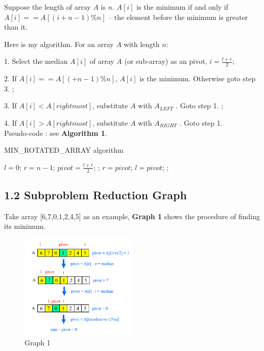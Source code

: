 \documentclass[UTF8]{ctexart}
\begin{document}
Suppose the length of array $ A$ is $ n $. $ A[i] $ is the minimum if and only if $ A[i] == A[(i+n-1)\%n] $ -- the element before the minimum is greater than it.

Here is my algorithm. For an array $ A $ with length $ n $:

1. Select the median $A[i]$ of array $ A $ (or sub-array) as an pivot, $i = \frac{l+r}{2}$;

2. If $ A[i] == A[(+n-1)\%n] $, $ A[i] $ is the minimum. Otherwise goto step 3. ;

3. If $ A[i] < A[rightmost] $, substitute $ A $ with $ A_{LEFT} $ . Goto step 1. ; 

4. If $ A[i] > A[rightmost] $, substitute $ A $ with $ A_{RIGHT} $ . Goto step 1. \\

Pseudo-code : see \textbf{Algorithm 1}. 

\begin{algorithm}[h]
	\caption{MIN\_ROTATED\_ARRAY algorithm}
	\begin{algorithmic}[1]
		\State $l = 0$;  $r = n - 1$; 
			\State $pivot = \frac{l + r}{2}$;
				\State {};
			\EndIf
				\State $r = pivot$;
			\Else
				\State $l=pivot$;
			\EndIf
		\EndWhile
		\State {} ;
		\EndFunction
	\end{algorithmic}
\end{algorithm}

\subsection*{1.2 Subproblem Reduction Graph} 
Take array [6,7,0,1,2,4,5] as an example, \textbf{Graph 1} shows the procedure of finding its minimum. 

\begin{figure} [htb]
	\centering
	\caption*{Graph 1}
	\includegraphics[width=0.5\textwidth]{figs/1.png}
\end{figure}
\end{document}
